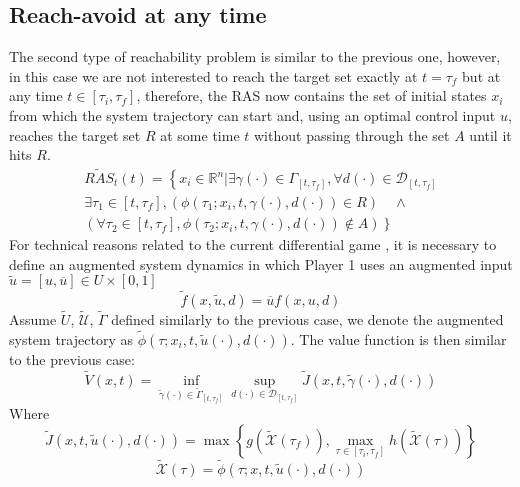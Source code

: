 \subsection{Reach-avoid at any time}
The second type of reachability problem is similar to the previous one, however, in this case we are not interested to reach the target set exactly at $t=\tau_f$ but at any time $t \in [\tau_i, \tau_f]$, therefore, the RAS now contains the set of initial states $x_i$ from which the system trajectory can start and, using an optimal control input $u$, reaches the target set $R$ at some time $t$ without passing through the set $A$ until it hits $R$.
\begin{multline}
    \label{ras_t}
    \widetilde{RAS}_{t}(t) = 
    \left\{
        x_i \in \mathbb{R}^n | \exists \gamma(\cdot) \in \Gamma_{[t, \tau_f]},   \forall d(\cdot) \in \mathcal{D}_{[t, \tau_f]} 
    \right.\\
        \exists \tau_1 \in [t, \tau_f],
        (\phi(\tau_1; x_i, t, \gamma(\cdot), d(\cdot)) \in R) \quad \wedge \quad \\ (\forall \tau_2 \in [t, \tau_f], \phi(\tau_2; x_i, t, \gamma(\cdot), d(\cdot)) \notin A)
    \left. 
    \right\}
\end{multline}
For technical reasons related to the current differential game \cite{reach_avoid_with_dist} \cite{mitchell_time_dep_HJ}, it is necessary to define an augmented system dynamics in which Player 1 uses an augmented input $\widetilde{u}=[u, \overline{u}] \in U \times [0,1]$
\[
    \widetilde{f}(x, \widetilde{u}, d) = \overline{u}f(x,u,d)
\]
Assume $\widetilde{U}$, $\widetilde{\mathcal{U}}$, $\widetilde{\Gamma}$ defined similarly to the previous case, we denote the augmented system trajectory as $\widetilde{\phi}(\tau; x_i, t, \widetilde{u}(\cdot), d(\cdot))$. The value function is then similar to the previous case:
\begin{equation}
    \label{aug_v}
    \widetilde{V}(x,t)=
        \inf_{\widetilde{\gamma}(\cdot) \in \widetilde{\Gamma}_{[t, \tau_f]}} 
        \sup_{d(\cdot) \in \mathcal{D}_{[t, \tau_f]}} 
            \widetilde{J}(x, t, \widetilde{\gamma}(\cdot), d(\cdot)) 
\end{equation}
Where
\[
    \widetilde{J}(x, t, \widetilde{u}(\cdot), d(\cdot)) = 
        \max
        \left\{
            g(\widetilde{\mathcal{X}}(\tau_f)), 
            \max_{\tau \in [\tau_i, \tau_f]}  h(\widetilde{\mathcal{X}}(\tau))
        \right\}
\]
\[
    \widetilde{\mathcal{X}}(\tau)=\widetilde{\phi}(\tau; x, t, \widetilde{u}(\cdot), d(\cdot))
\]
